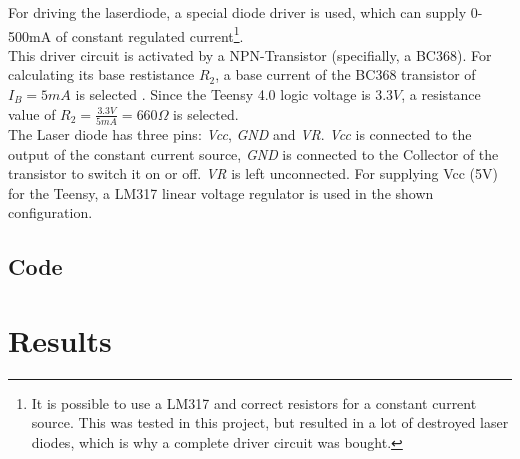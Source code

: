 \documentclass[a4paper, 11pt]{scrartcl}
\begin{document}
For driving the laserdiode, a special diode driver is used, which can supply 0-500mA of constant regulated current\footnote{It is possible to use a LM317 and correct resistors for a constant current source. This was tested in this project, but resulted in a lot of destroyed laser diodes, which is why a complete driver circuit was bought.}. \\
This driver circuit is activated by a NPN-Transistor (specifially, a BC368). For calculating its base restistance $R_2$, a base current of the BC368 transistor of $I_B=5mA$ is selected \cite[p. 3]{SemiconductorComponentsIndustries.2007}. Since the Teensy 4.0 logic voltage is $3.3V$, a resistance value of $R_2=\frac{3.3V}{5mA}=660\Omega$ is selected. \\
The Laser diode has three pins: \textit{Vcc}, \textit{GND} and \textit{VR}. \textit{Vcc} is connected to the output of the constant current source, \textit{GND} is connected to the Collector of the transistor to switch it on or off. \textit{VR} is left unconnected. 
For supplying Vcc (5V) for the Teensy, a LM317 linear voltage regulator is used in the shown configuration. 
\subsection{Code}

\section{Results}
 

\end{document}
